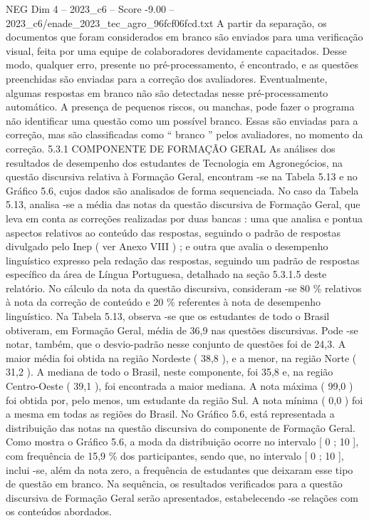 \begin{textsample}{NEG Dim 4 – 2023\_c6 – Score -9.00 – 2023\_c6/enade\_2023\_tec\_agro\_96fcf06fcd.txt}
A partir da separação, os documentos que foram considerados em branco são enviados para uma verificação visual, feita por uma equipe de colaboradores devidamente capacitados.
Desse modo, qualquer erro, presente no pré-processamento, é encontrado, e as questões preenchidas são enviadas para a correção dos avaliadores.
Eventualmente, algumas respostas em branco não são detectadas nesse pré-processamento automático.
A presença de pequenos riscos, ou manchas, pode fazer o programa não identificar uma questão como um possível branco.
Essas são enviadas para a correção, mas são classificadas como “ branco ” pelos avaliadores, no momento da correção. 5.3.1 COMPONENTE DE FORMAÇÃO GERAL As análises dos resultados de desempenho dos estudantes de Tecnologia em Agronegócios, na questão discursiva relativa à Formação Geral, encontram -se na Tabela 5.13 e no Gráfico 5.6, cujos dados são analisados de forma sequenciada.
No caso da Tabela 5.13, analisa -se a média das notas da questão discursiva de Formação Geral, que leva em conta as correções realizadas por duas bancas : uma que analisa e pontua aspectos relativos ao conteúdo das respostas, seguindo o padrão de respostas divulgado pelo Inep ( ver Anexo VIII ) ; e outra que avalia o desempenho linguístico expresso pela redação das respostas, seguindo um padrão de respostas específico da área de Língua Portuguesa, detalhado na seção 5.3.1.5 deste relatório.
No cálculo da nota da questão discursiva, consideram -se 80 \% relativos à nota da correção de conteúdo e 20 \% referentes à nota de desempenho linguístico.
Na Tabela 5.13, observa -se que os estudantes de todo o Brasil obtiveram, em Formação Geral, média de 36,9 nas questões discursivas.
Pode -se notar, também, que o desvio-padrão nesse conjunto de questões foi de 24,3.
A maior média foi obtida na região Nordeste ( 38,8 ), e a menor, na região Norte ( 31,2 ).
A mediana de todo o Brasil, neste componente, foi 35,8 e, na região Centro-Oeste ( 39,1 ), foi encontrada a maior mediana.
A nota máxima ( 99,0 ) foi obtida por, pelo menos, um estudante da região Sul.
A nota mínima ( 0,0 ) foi a mesma em todas as regiões do Brasil.
No Gráfico 5.6, está representada a distribuição das notas na questão discursiva do componente de Formação Geral.
Como mostra o Gráfico 5.6, a moda da distribuição ocorre no intervalo [ 0 ; 10 ], com frequência de 15,9 \% dos participantes, sendo que, no intervalo [ 0 ; 10 ], inclui -se, além da nota zero, a frequência de estudantes que deixaram esse tipo de questão em branco.
Na sequência, os resultados verificados para a questão discursiva de Formação Geral serão apresentados, estabelecendo -se relações com os conteúdos abordados.

\end{textsample}

